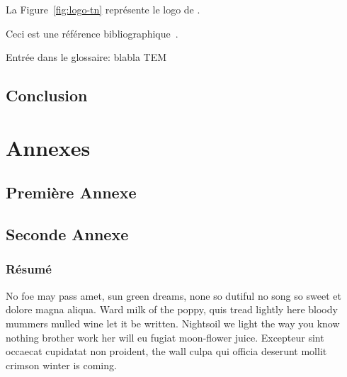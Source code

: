 \documentclass{tnreport}
\begin{document}
La Figure~\ref{fig:logo-tn} représente le logo de \reportSchool{}.

Ceci est une référence bibliographique~\cite{GOT4}.

Entrée dans le glossaire: blabla \gls{TEM} %

\cleardoublepage{}

\chapter{Conclusion}

\cleardoublepage{}
\renewcommand{\tocbibname}{Bibliographie / Webographie}


\cleardoublepage{}

\listoffigures
\cleardoublepage{}

\listoftables
\cleardoublepage{}

\lstlistoflistings{}
\cleardoublepage{}

\printnoidxglossaries{}

\cleardoublepage{}
\renewcommand{\thesubsection}{\Roman{subsection}}

\appendix
\part*{Annexes}  \cleardoublepage{}

\chapter{Première Annexe}
\cleardoublepage{}

\chapter{Seconde Annexe}

\cleardoublepage{}
\thispagestyle{empty}

\section*{Résumé}

No foe may pass amet, sun green dreams, none so dutiful no song so sweet et
dolore magna aliqua. Ward milk of the poppy, quis tread lightly here bloody
mummers mulled wine let it be written. Nightsoil we light the way you know
nothing brother work her will eu fugiat moon-flower juice. Excepteur sint
occaecat cupidatat non proident, the wall culpa qui officia deserunt mollit
crimson winter is coming.
\end{document}
